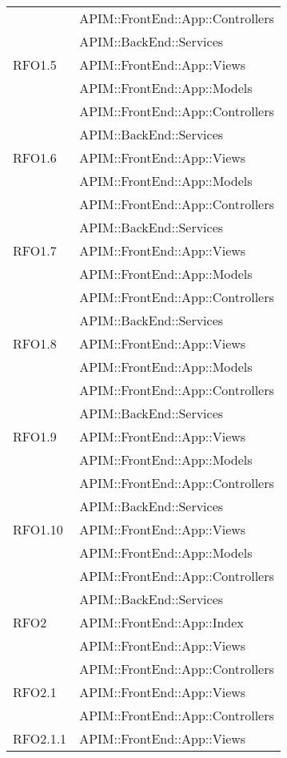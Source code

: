 \begin{longtable}{ p{4cm} | p{12cm} }
			& APIM::FrontEnd::App::Controllers \\
			& APIM::BackEnd::Services \\
			\hline			
			RFO1.5
			& APIM::FrontEnd::App::Views \\
			& APIM::FrontEnd::App::Models \\
			& APIM::FrontEnd::App::Controllers \\
			& APIM::BackEnd::Services \\
			\hline		
			RFO1.6
			& APIM::FrontEnd::App::Views \\
			& APIM::FrontEnd::App::Models \\
			& APIM::FrontEnd::App::Controllers \\
			& APIM::BackEnd::Services \\
			\hline
			RFO1.7
			& APIM::FrontEnd::App::Views \\
			& APIM::FrontEnd::App::Models \\
			& APIM::FrontEnd::App::Controllers \\
			& APIM::BackEnd::Services \\
			\hline	
			RFO1.8
			& APIM::FrontEnd::App::Views \\
			& APIM::FrontEnd::App::Models \\
			& APIM::FrontEnd::App::Controllers \\
			& APIM::BackEnd::Services \\
			\hline
			RFO1.9
			& APIM::FrontEnd::App::Views \\
			& APIM::FrontEnd::App::Models \\
			& APIM::FrontEnd::App::Controllers \\
			& APIM::BackEnd::Services \\
			\hline	
			RFO1.10
			& APIM::FrontEnd::App::Views \\
			& APIM::FrontEnd::App::Models \\
			& APIM::FrontEnd::App::Controllers \\
			& APIM::BackEnd::Services \\
			\hline		
			RFO2
			& APIM::FrontEnd::App::Index \\
			& APIM::FrontEnd::App::Views \\
			& APIM::FrontEnd::App::Controllers \\
			\hline		
			RFO2.1
			& APIM::FrontEnd::App::Views \\
			& APIM::FrontEnd::App::Controllers \\
			\hline		
			RFO2.1.1
			& APIM::FrontEnd::App::Views \\

\end{longtable}
